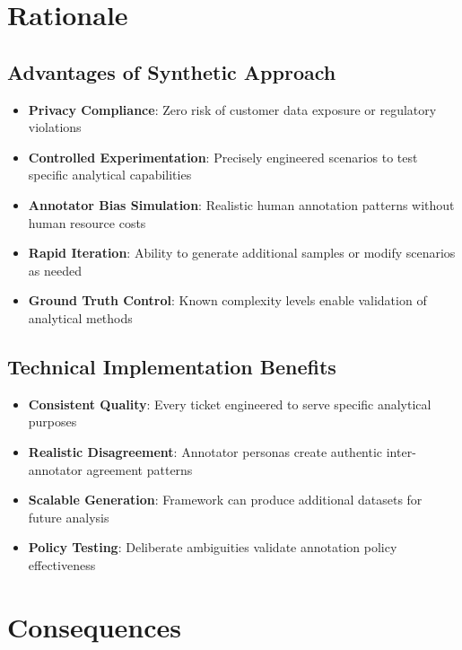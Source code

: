 \documentclass[11pt]{article}
\begin{document}
\section{Rationale}

\subsection{Advantages of Synthetic Approach}
\begin{itemize}
\item \textbf{Privacy Compliance}: Zero risk of customer data exposure or regulatory violations
\item \textbf{Controlled Experimentation}: Precisely engineered scenarios to test specific analytical capabilities
\item \textbf{Annotator Bias Simulation}: Realistic human annotation patterns without human resource costs
\item \textbf{Rapid Iteration}: Ability to generate additional samples or modify scenarios as needed
\item \textbf{Ground Truth Control}: Known complexity levels enable validation of analytical methods
\end{itemize}

\subsection{Technical Implementation Benefits}
\begin{itemize}
\item \textbf{Consistent Quality}: Every ticket engineered to serve specific analytical purposes
\item \textbf{Realistic Disagreement}: Annotator personas create authentic inter-annotator agreement patterns
\item \textbf{Scalable Generation}: Framework can produce additional datasets for future analysis
\item \textbf{Policy Testing}: Deliberate ambiguities validate annotation policy effectiveness
\end{itemize}

\section{Consequences}
\end{document}
